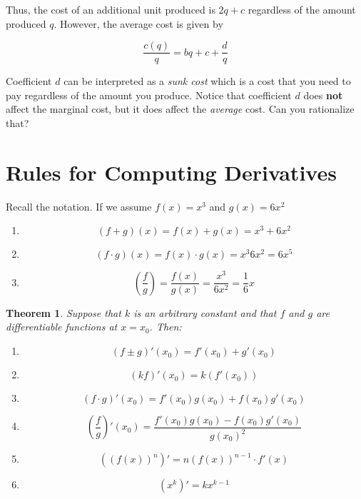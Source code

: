 \documentclass[11pt]{article}
\providecommand{\tightlist}{%
      \setlength{\itemsep}{0pt}\setlength{\parskip}{0pt}}
\theoremstyle{definition}
\theoremstyle{plain}
\newtheorem{theorem}{Theorem}
\begin{document}
Thus, the cost of an additional unit produced is \(2q + c\) regardless
of the amount produced \(q\). However, the average cost is given by

\[
\frac{c(q)}{q} = bq + c + \frac{d}{q}
\]

Coefficient \(d\) can be interpreted as a \emph{sunk cost} which is a
cost that you need to pay regardless of the amount you produce. Notice
that coefficient \(d\) does \textbf{not} affect the marginal cost, but
it does affect the \emph{average} cost. Can you rationalize that?

\section{Rules for Computing
Derivatives}\label{rules-for-computing-derivatives}

Recall the notation. If we assume \(f(x) = x^3\) and \(g(x) = 6x^2\)

\begin{enumerate}
\def\labelenumi{\arabic{enumi}.}
\tightlist
\item
  \[(f + g)(x) = f(x) + g(x) = x^3 + 6x^2\]
\item
  \[(f\cdot g)(x) = f(x)\cdot g(x) = x^3 6x^2 = 6x^5\]
\item
  \[\left(\frac{f}{g}\right) = \frac{f(x)}{g(x)} = \frac{x^3}{6x^2} = \frac{1}{6}x\]
\end{enumerate}

\begin{theorem}\label{thm:deri_rules}
Suppose that \(k\) is an arbitrary constant and that
\(f\) and \(g\) are differentiable functions at \(x = x_0\). Then:

\begin{enumerate}
\def\labelenumi{\arabic{enumi}.}
\tightlist
\item
  \[(f\pm g)'(x_0) = f'(x_0) + g'(x_0)\]
\item
  \[(kf)'(x_0) = k\left(f'(x_0)\right)\]
\item
  \[(f\cdot g)'(x_0) = f'(x_0)g(x_0) + f(x_0)g'(x_0)\]
\item
  \[\left(\frac{f}{g}\right)'(x_0) = \frac{f'(x_0)g(x_0) - f(x_0)g'(x_0)}{g(x_0)^2}\]
\item
  \[\left(\left(f(x)\right)^n\right)' = n\left(f(x)\right)^{n-1}\cdot f'(x)\]
\item
  \[\left(x^k\right)' = kx^{k-1}\]
\end{enumerate}
\end{theorem}
\end{document}
